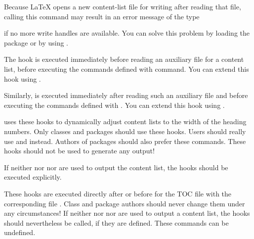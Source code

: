 Because \LaTeX{} opens a new content-list file for
writing after reading that file, calling this command may result in an error
message of the type
if no more write handles are available. You can solve this problem by loading
the 
package \cite{package:scrwfile} or by using \LuaLaTeX{}.%
\EndIndexGroup


\begin{Declaration}
\end{Declaration}
The  hook is executed immediately before reading
an auxiliary file for a content list, before executing the commands defined
with  command. You can extend this
hook using .

Similarly,  is executed immediately after reading
such an auxiliary file and before executing the commands defined with
. You can extend this hook using
.

\KOMAScript{} uses these hooks to dynamically adjust content lists to the
width of the heading numbers. Only classes and packages should use these
hooks. Users should really use
 and
 instead. Authors of packages should
also prefer these commands. These hooks should not be used to generate any
output!

If neither  nor
 nor  are
used to output the content list, the hooks should be executed explicitly.%
\EndIndexGroup


\begin{Declaration}
\end{Declaration}
These hooks are executed directly after
 or before
 for the TOC file with the
corresponding file . Class and package
authors should never change them under any circumstances! If
neither  nor
 nor  are
used to output a content list, the hooks should nevertheless be called, if
they are defined. These commands can be undefined.%
\iffalse %
For an appropriate test, see \DescRef{scrbase.cmd.Ifundefinedorrelax}%
\IndexCmd{Ifundefinedorrelax} in \autoref{sec:scrbase.if},
\DescPageRef{scrbase.cmd.Ifundefinedorrelax}.%
\fi%
\EndIndexGroup


